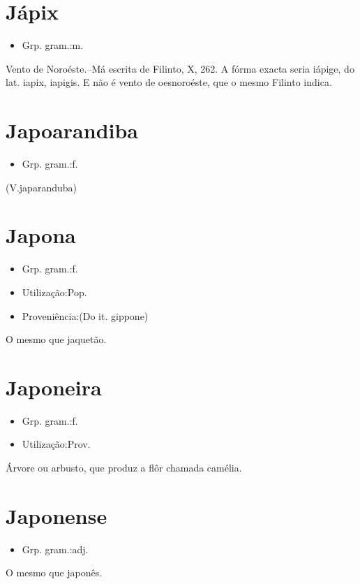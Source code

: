 \documentclass{article}
\begin{document}
\section{Jápix}
\begin{itemize}
\item {Grp. gram.:m.}
\end{itemize}
Vento de Noroéste.--Má escrita de Filinto, X, 262. A fórma exacta seria \textunderscore iápige\textunderscore , do lat. \textunderscore iapix\textunderscore , \textunderscore iapigis\textunderscore . E não é vento de \textunderscore oesnoroéste\textunderscore , que o mesmo Filinto indica.
\section{Japoarandiba}
\begin{itemize}
\item {Grp. gram.:f.}
\end{itemize}
(V.japaranduba)
\section{Japona}
\begin{itemize}
\item {Grp. gram.:f.}
\end{itemize}
\begin{itemize}
\item {Utilização:Pop.}
\end{itemize}
\begin{itemize}
\item {Proveniência:(Do it. \textunderscore gippone\textunderscore )}
\end{itemize}
O mesmo que \textunderscore jaquetão\textunderscore .
\section{Japoneira}
\begin{itemize}
\item {Grp. gram.:f.}
\end{itemize}
\begin{itemize}
\item {Utilização:Prov.}
\end{itemize}
Árvore ou arbusto, que produz a flôr chamada camélia.
\section{Japonense}
\begin{itemize}
\item {Grp. gram.:adj.}
\end{itemize}
O mesmo que \textunderscore japonês\textunderscore .
\end{document}
